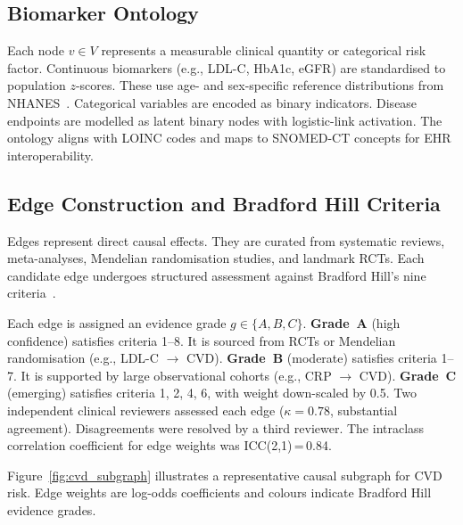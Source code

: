 \documentclass[runningheads]{llncs}
\begin{document}
\subsection{Biomarker Ontology}\label{sec:ontology}

Each node $v \in V$ represents a measurable clinical quantity or
categorical risk factor.
Continuous biomarkers (e.g., LDL-C, HbA1c, eGFR) are standardised to
population $z$-scores.
These use age- and sex-specific reference distributions from
NHANES~\cite{nhanes2020}.
Categorical variables are encoded as binary indicators.
Disease endpoints are modelled as latent binary nodes with
logistic-link activation.
The ontology aligns with LOINC codes and maps to SNOMED-CT concepts
for EHR interoperability.

\subsection{Edge Construction and Bradford Hill Criteria}
\label{sec:edges}

Edges represent direct causal effects.
They are curated from systematic reviews, meta-analyses, Mendelian
randomisation studies, and landmark RCTs.
Each candidate edge undergoes structured assessment against
Bradford Hill's nine criteria~\cite{hill1965environment}.

Each edge is assigned an evidence grade $g \in \{A, B, C\}$.
\textbf{Grade~A} (high confidence) satisfies criteria 1--8.
It is sourced from RCTs or Mendelian randomisation
(e.g., LDL-C $\rightarrow$ CVD).
\textbf{Grade~B} (moderate) satisfies criteria 1--7.
It is supported by large observational cohorts
(e.g., CRP $\rightarrow$ CVD).
\textbf{Grade~C} (emerging) satisfies criteria 1, 2, 4, 6, with
weight down-scaled by 0.5.
Two independent clinical reviewers assessed each edge
($\kappa = 0.78$, substantial agreement).
Disagreements were resolved by a third reviewer.
The intraclass correlation coefficient for edge weights was
ICC(2,1)\,=\,0.84.

Figure~\ref{fig:cvd_subgraph} illustrates a representative causal
subgraph for CVD risk.
Edge weights are log-odds coefficients and colours indicate Bradford
Hill evidence grades.
\end{document}
